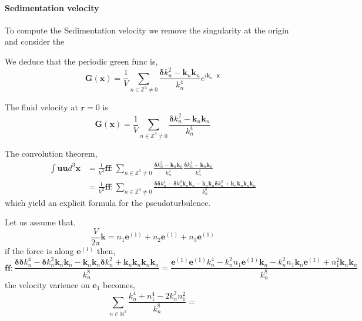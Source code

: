 \paragraph{Sedimentation velocity}
To compute the Sedimentation velocity we remove the singularity at the origin and consider the 


We deduce that the periodic green func is, 
\begin{equation}
    \textbf{G}(\textbf{x})
    =
    \frac{1}{V}\sum_{n\in \mathbb{Z}^3\neq 0} \frac{\bm\delta k_n^2 - \textbf{k}_n\textbf{k}_n}{k_n^4} e^{i \textbf{k}_n \cdot \textbf{x}}
\end{equation}

The fluid velocity at $\textbf{r} = 0$ is 
\begin{equation}
    \textbf{G}(\textbf{x})
    =
    \frac{1}{V}\sum_{n\in \mathbb{Z}^3\neq 0} \frac{\bm\delta k_n^2 - \textbf{k}_n\textbf{k}_n}{k_n^4} 
\end{equation}

The convolution theorem, 
\begin{align*}
    \int \textbf{uu} d^3\textbf{x}
    &=
    \frac{1}{V^2} \textbf{ff}: \sum_{n\in \mathbb{Z}^3\neq 0} 
    \frac{\bm\delta k_n^2 - \textbf{k}_n\textbf{k}_n}{k_n^4} 
    \frac{\bm\delta k_n^2 - \textbf{k}_n\textbf{k}_n}{k_n^4} \\
    &=
    \frac{1}{V^2} \textbf{ff}: \sum_{n\in \mathbb{Z}^3\neq 0} 
    \frac{\bm\delta\bm\delta k_n^4 
    - \bm\delta k_n^2\textbf{k}_n\textbf{k}_n
    - \textbf{k}_n\textbf{k}_n\bm\delta k_n^2
    + \textbf{k}_n\textbf{k}_n\textbf{k}_n \textbf{k}_n }{k_n^8} 
\end{align*} 
which yield an explicit formula for the pseudoturbulence. 

Let us assume that,
\begin{equation}
    \frac{V}{2\pi}\textbf{k} = n_1\textbf{e}^{(1)}+n_2\textbf{e}^{(1)}+n_3\textbf{e}^{(1)}
\end{equation}
if the force is along $\textbf{e}^{(1)}$ then, 
\begin{equation}
    \textbf{ff}: 
    \frac{\bm\delta\bm\delta k_n^4 
    - \bm\delta k_n^2\textbf{k}_n\textbf{k}_n
    - \textbf{k}_n\textbf{k}_n\bm\delta k_n^2
    + \textbf{k}_n\textbf{k}_n\textbf{k}_n \textbf{k}_n }{k_n^8} 
    = 
    \frac{\textbf{e}^{(1)}\textbf{e}^{(1)} k_n^4 
    -  k_n^2 n_1\textbf{e}^{(1)}\textbf{k}_n
    -  k_n^2 n_1\textbf{k}_n\textbf{e}^{(1)}
    + n_1^2 \textbf{k}_n \textbf{k}_n }{k_n^8} 
\end{equation}
the velocity varience on $\textbf{e}_1$ becomes,
\begin{equation}
    \sum_{n\in \mathbb{N}^3} \frac{k_n^4 + n_1^4
    -  2k_n^2 n_1^2
      }{k_n^8} 
      = 
\end{equation}



